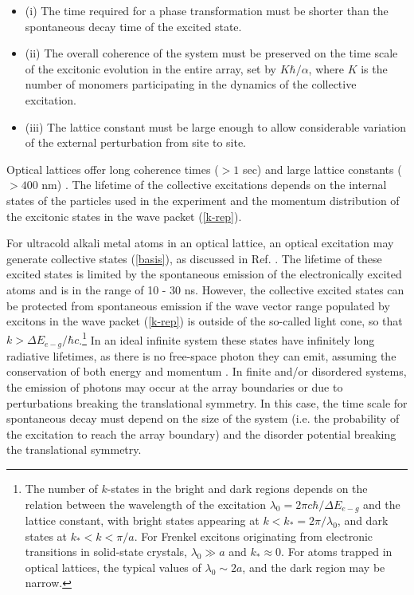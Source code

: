 \begin{itemize}
\item
 (i) The time required for a  phase transformation must
be shorter than the spontaneous decay time of the excited
state.

\item
 (ii) The overall coherence of the system  must be preserved
on the time scale of the excitonic evolution in the entire array, set by $K\hbar/\alpha$, where $K$
 is the number of monomers participating in the dynamics of the collective excitation.

\item
(iii) The lattice constant must be large enough to allow considerable variation of the external
 perturbation from site to site.

%
\end{itemize}

Optical lattices offer long coherence times ($> 1$ sec) and large lattice constants ($>400$ nm)
 \cite{optical-lattice-review}. The lifetime of the
collective excitations depends on the internal states
 of the particles used in the experiment and the momentum distribution of the excitonic states in the wave packet
(\ref{k-rep}).


For ultracold alkali metal atoms in an optical lattice, an optical excitation may generate collective states (\ref{basis}),
as discussed in Ref. \cite{electronic-exciton1, electronic-exciton2}.
The lifetime of these excited states is limited by the spontaneous emission of the electronically excited atoms and is
in the range of 10 - 30 ns.
However, the collective excited states can be protected from spontaneous emission if the wave vector range populated by excitons in the wave packet (\ref{k-rep}) is
outside of the so-called light cone, so that $k >\Delta E_{e-g}/\hbar c$.\footnote{  
The number of $k$-states in the bright and dark regions depends on the relation between the wavelength of the 
excitation $\lambda_0 = 2\pi c \hbar / \Delta E_{e-g} $ and the lattice constant, with bright states appearing at $k < k_* = 2\pi / \lambda_0$, and dark
states at $k_* < k < \pi/a$. For Frenkel excitons originating from electronic transitions in solid-state crystals, $\lambda_0 \gg a$ and $k_*
\approx 0$. For atoms trapped in optical lattices, the typical values of $\lambda_0 \sim 2a$, and the dark region may be narrow. }
 In an ideal infinite system these states have infinitely long radiative lifetimes, as there is no free-space 
photon they can emit, assuming the conservation of both energy and momentum \cite{electronic-exciton1, 
electronic-exciton2, agranovich1966, agranovich}.
In finite and/or disordered systems, the emission of photons may occur at the array boundaries or due to perturbations 
breaking the translational symmetry. In this case, the time scale for spontaneous decay must depend on 
the size of the system (i.e. the probability of the excitation to reach the array boundary) and the disorder potential 
breaking the translational symmetry.  

